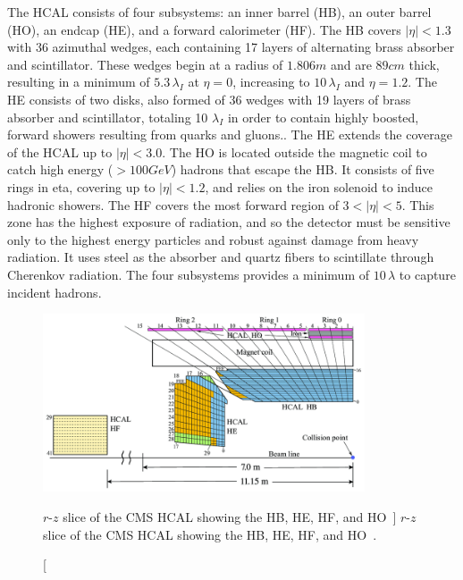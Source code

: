 The HCAL consists of four subsystems: an inner barrel (HB), an outer barrel (HO), an endcap (HE), and a forward calorimeter (HF). The HB covers $\left|\eta\right|<1.3$ with 36 azimuthal wedges, each containing 17 layers of alternating brass absorber and scintillator. These wedges begin at a radius of $1.806\unit{m}$ and are $89\unit{cm}$ thick, resulting in a minimum of $5.3\,\lambda_I$ at $\eta=0$, increasing to $10\,\lambda_I$ and $\eta=1.2$. The HE consists of two disks, also formed of 36 wedges with 19 layers of brass absorber and scintillator, totaling 10 $\lambda_I$ in order to contain highly boosted, forward showers resulting from quarks and gluons.. The HE extends the coverage of the HCAL up to $\left|\eta\right| < 3.0$. The HO is located outside the magnetic coil to catch high energy ($>100\unit{GeV}$) hadrons that escape the HB. It consists of five rings in eta, covering up to $\left|\eta\right|<1.2$, and relies on the iron solenoid to induce hadronic showers. The HF covers the most forward region of $3<\left|\eta\right|<5$. This zone has the highest exposure of radiation, and so the detector must be sensitive only to the highest energy particles and robust against damage from heavy radiation. It uses steel as the absorber and quartz fibers to scintillate through Cherenkov radiation. The four subsystems provides a minimum of $10\,\lambda$ to capture incident hadrons.

\begin{figure}[htpb]
	\centering
	\includegraphics[width=0.85\textwidth]{figs/03_experiment/A-schematic-view-of-one-quarter-of-the-CMS-HCAL-during-2016-LHC-operation-showing-the.png}
	\caption
	[$r$-$z$ slice of the CMS HCAL showing the HB, HE, HF, and HO~\cite{Sirunyan:2691403}]
	{$r$-$z$ slice of the CMS HCAL showing the HB, HE, HF, and HO~\cite{Sirunyan:2691403}.}
	\label{fig:hcal}
\end{figure}

